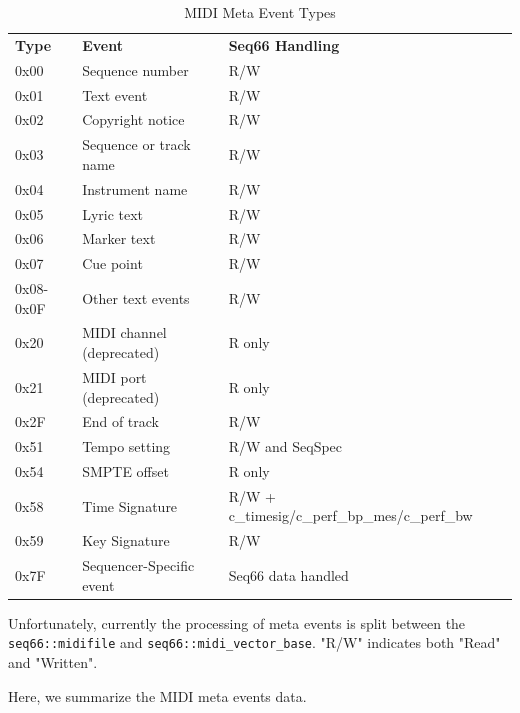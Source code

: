    \begin{table}
      \centering
      \caption{MIDI Meta Event Types}
      \label{table:midi_meta_event_types}
      \begin{tabular}{l l l}
         \textbf{Type} & \textbf{Event} & \textbf{Seq66 Handling}\\
         0x00 & Sequence number                 & R/W \\
         0x01 & Text event                      & R/W \\
         0x02 & Copyright notice                & R/W \\
         0x03 & Sequence or track name          & R/W \\
         0x04 & Instrument name                 & R/W \\
         0x05 & Lyric text                      & R/W \\
         0x06 & Marker text                     & R/W \\
         0x07 & Cue point                       & R/W \\
         0x08-0x0F & Other text events          & R/W \\
         0x20 & MIDI channel (deprecated)       & R only \\
         0x21 & MIDI port (deprecated)          & R only \\
         0x2F & End of track                    & R/W \\
         0x51 & Tempo setting                   & R/W and SeqSpec \\
         0x54 & SMPTE offset                    & R only \\
         0x58 & Time Signature & R/W + c\_timesig/c\_perf\_bp\_mes/c\_perf\_bw \\
         0x59 & Key Signature                   & R/W \\
         0x7F & Sequencer-Specific event        & Seq66 data handled \\
      \end{tabular}
   \end{table}

   Unfortunately, currently the processing of meta events is split between the
   \texttt{seq66::midifile} and
   \texttt{seq66::midi\_vector\_base}.
   "R/W" indicates both "Read" and "Written".

   Here, we summarize the MIDI meta events data.

